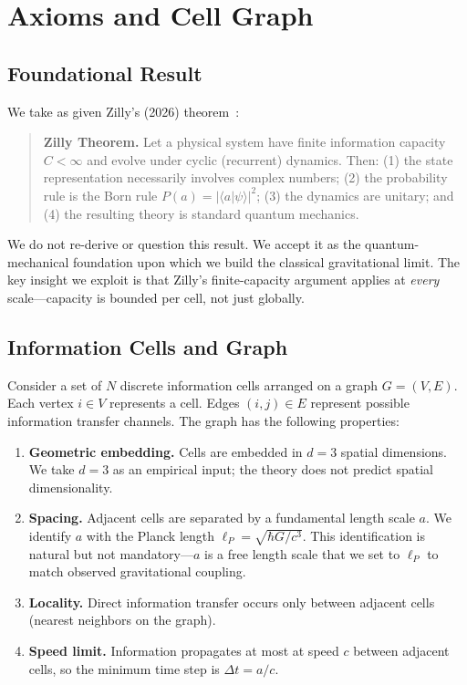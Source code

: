 \documentclass[aps,prd,twocolumn,showpacs,superscriptaddress,preprintnumbers]{revtex4-2}
\begin{document}
\section{Axioms and Cell Graph}
\label{sec:axioms}

\subsection{Foundational Result}

We take as given Zilly's (2026) theorem~\cite{Zilly:2026}:

\begin{quote}
\textbf{Zilly Theorem.} Let a physical system have finite information capacity $C<\infty$ and evolve under cyclic (recurrent) dynamics. Then: (1) the state representation necessarily involves complex numbers; (2) the probability rule is the Born rule $P(a)=|\langle a|\psi\rangle|^2$; (3) the dynamics are unitary; and (4) the resulting theory is standard quantum mechanics.
\end{quote}

We do not re-derive or question this result.
We accept it as the quantum-mechanical foundation upon which we build the classical gravitational limit.
The key insight we exploit is that Zilly's finite-capacity argument applies at \emph{every} scale---capacity is bounded per cell, not just globally.

\subsection{Information Cells and Graph}

Consider a set of $N$ discrete information cells arranged on a graph $G=(V,E)$.
Each vertex $i\in V$ represents a cell.
Edges $(i,j)\in E$ represent possible information transfer channels.
The graph has the following properties:

\begin{enumerate}
    \item \textbf{Geometric embedding.} Cells are embedded in $d=3$ spatial dimensions. We take $d=3$ as an empirical input; the theory does not predict spatial dimensionality.
    \item \textbf{Spacing.} Adjacent cells are separated by a fundamental length scale $a$. We identify $a$ with the Planck length $\ell_P=\sqrt{\hbar G/c^3}$. This identification is natural but not mandatory---$a$ is a free length scale that we set to $\ell_P$ to match observed gravitational coupling.
    \item \textbf{Locality.} Direct information transfer occurs only between adjacent cells (nearest neighbors on the graph).
    \item \textbf{Speed limit.} Information propagates at most at speed $c$ between adjacent cells, so the minimum time step is $\Delta t = a/c$.
\end{enumerate}
\end{document}

